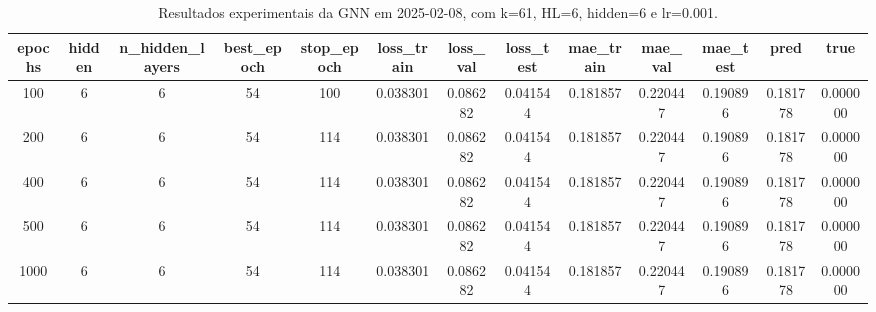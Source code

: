 \begin{table}[h]
\centering
\caption{Resultados experimentais da GNN em 2025-02-08, com k=61, HL=6, hidden=6 e lr=0.001.}
\label{tab:gnn_results_k61_hl6_h6_d20250208}
\begin{tabular}{ccccccccccccc}
\toprule
epochs & hidden & n\_hidden\_layers & best\_epoch & stop\_epoch & loss\_train & loss\_val & loss\_test & mae\_train & mae\_val & mae\_test & pred & true \\
\midrule
100 & 6 & 6 & 54 & 100 & 0.038301 & 0.086282 & 0.041544 & 0.181857 & 0.220447 & 0.190896 & 0.181778 & 0.000000 \\
200 & 6 & 6 & 54 & 114 & 0.038301 & 0.086282 & 0.041544 & 0.181857 & 0.220447 & 0.190896 & 0.181778 & 0.000000 \\
400 & 6 & 6 & 54 & 114 & 0.038301 & 0.086282 & 0.041544 & 0.181857 & 0.220447 & 0.190896 & 0.181778 & 0.000000 \\
500 & 6 & 6 & 54 & 114 & 0.038301 & 0.086282 & 0.041544 & 0.181857 & 0.220447 & 0.190896 & 0.181778 & 0.000000 \\
1000 & 6 & 6 & 54 & 114 & 0.038301 & 0.086282 & 0.041544 & 0.181857 & 0.220447 & 0.190896 & 0.181778 & 0.000000 \\
\bottomrule
\end{tabular}
\end{table}
